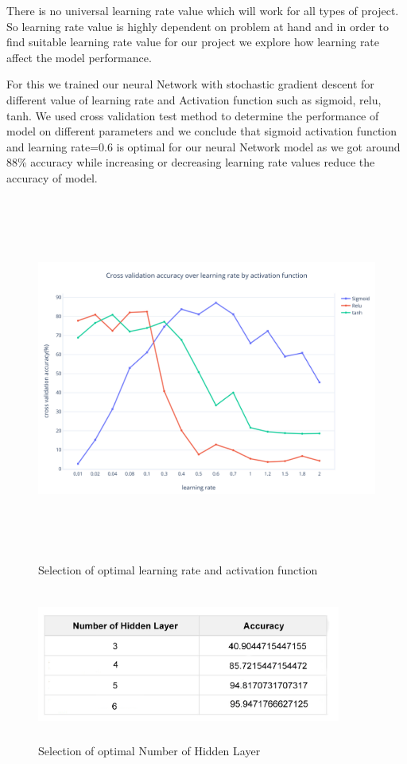 There is no universal learning rate value which will work for all types of project. So learning rate value is highly dependent on problem at hand and in order to find suitable learning rate value for our project we explore how learning rate affect the model performance.

For this we trained our neural Network with stochastic gradient descent for different value of learning rate and Activation function such as sigmoid, relu, tanh. We used cross validation test method to determine the performance of model on different parameters and  we conclude that sigmoid activation function and learning rate=0.6 is optimal for our neural Network model as we got around 88\%  accuracy while increasing or decreasing learning rate values reduce the accuracy of model.

\begin{figure}[H]
\begin{center}
    
\includegraphics[width=170mm,height=120mm]{dataset_summary/selectionHyperparameter.png}
 \caption{Selection of optimal learning rate and activation function}
 \end{center}                
\end{figure}

\begin{figure}[H]
\begin{center}
    
\includegraphics[width=100mm,height=50mm]{comparison/hiddenlayer.jpg}
 \caption{Selection of optimal Number of Hidden Layer}
 \end{center}                
\end{figure}


